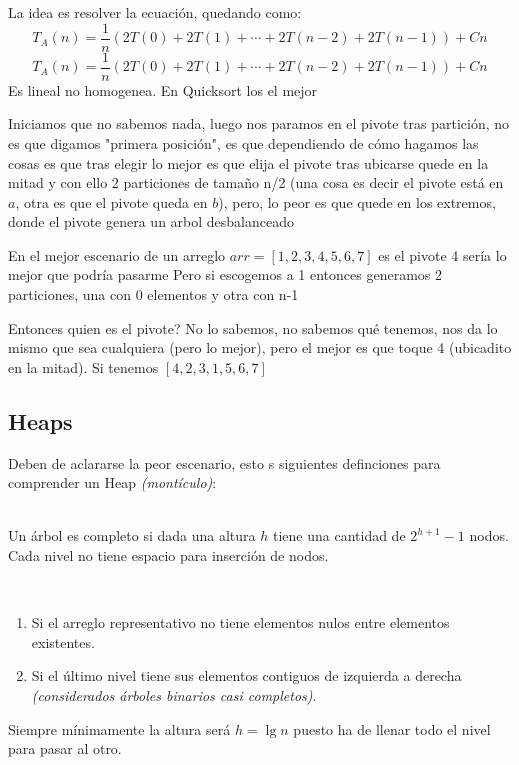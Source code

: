 \documentclass[tikz,11pt,fleqn]{book} %
\begin{document}
La idea es resolver la ecuación, quedando como:
$$
    T_A(n)=\frac1n(2T(0)+2T(1)+\cdots+2T(n-2)+2T(n-1))+Cn
$$ $$
    T_A(n)=\frac1n(2T(0)+2T(1)+\cdots+2T(n-2)+2T(n-1))+Cn
$$
Es lineal no homogenea.
En Quicksort los el mejor 

Iniciamos que no sabemos nada, luego nos paramos en el pivote tras partición, no es que digamos "primera posición", es que dependiendo de cómo hagamos las cosas es que tras elegir lo mejor es que elija el pivote tras ubicarse quede en la mitad y con ello 2 particiones de tamaño n/2 (una cosa es decir el pivote está en $a$, otra es que el pivote queda en $b$), pero, lo peor es que quede en los extremos, donde el pivote genera un arbol desbalanceado

En el mejor escenario de un arreglo $arr=[1,2,3,4,5,6,7]$ es el pivote 4 sería lo mejor que podría pasarme
Pero si escogemos a 1 entonces generamos 2 particiones, una con 0 elementos y otra con n-1

Entonces quien es el pivote? No lo sabemos, no sabemos qué tenemos, nos da lo mismo que sea cualquiera (pero lo mejor), pero el mejor es que toque 4 (ubicadito en la mitad). Si tenemos $[4,2,3,1,5,6,7]$




\subsection{Heaps}
Deben de aclararse la peor escenario, esto s siguientes definciones para comprender un Heap \textit{(montículo)}:

\begin{definition}~\\
    Un árbol es completo si dada una altura $h$ tiene una cantidad de $2^{h+1}-1$ nodos. Cada nivel no tiene espacio para inserción de nodos.
\end{definition}

\begin{definition}~
    \begin{enumerate}
        \item Si el arreglo representativo no tiene elementos nulos entre elementos existentes.
        \item Si el último nivel tiene sus elementos contiguos de izquierda a derecha \textit{(considerados árboles binarios casi completos)}.
    \end{enumerate}
    Siempre mínimamente la altura será $h=\lg n$ puesto ha de llenar todo el nivel para pasar al otro.
\end{definition}
\end{document}
